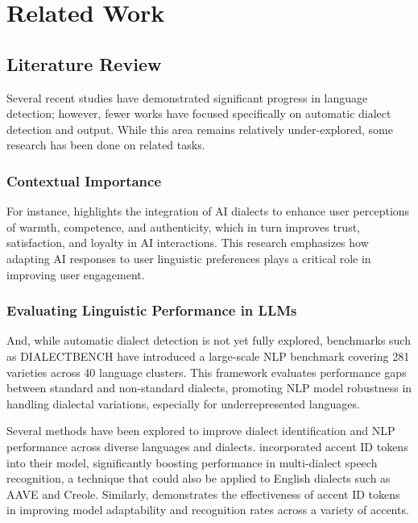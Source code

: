 \section{Related Work}
\label{sec:related-work}
                                            
\subsection{Literature Review}
Several recent studies have demonstrated significant progress in language detection; however, fewer works have focused specifically on automatic dialect detection and output. While this area remains relatively under-explored, some research has been done on related tasks.

\subsubsection{Contextual Importance}

For instance, \cite{Martin:24} highlights the integration of AI dialects to enhance user perceptions of warmth, competence, and authenticity, which in turn improves trust, satisfaction, and loyalty in AI interactions. This research emphasizes how adapting AI responses to user linguistic preferences plays a critical role in improving user engagement.

\subsubsection{Evaluating Linguistic Performance in LLMs}

And, while automatic dialect detection is not yet fully explored, benchmarks such as DIALECTBENCH \cite{Faisal:24} have introduced a large-scale NLP benchmark covering 281 varieties across 40 language clusters. This framework evaluates performance gaps between standard and non-standard dialects, promoting NLP model robustness in handling dialectal variations, especially for underrepresented languages.

Several methods have been explored to improve dialect identification and NLP performance across diverse languages and dialects. \cite{Jauhiainen:19} incorporated accent ID tokens into their model, significantly boosting performance in multi-dialect speech recognition, a technique that could also be applied to English dialects such as AAVE and Creole. Similarly, \cite{Hinsvark:21} demonstrates the effectiveness of accent ID tokens in improving model adaptability and recognition rates across a variety of accents.

